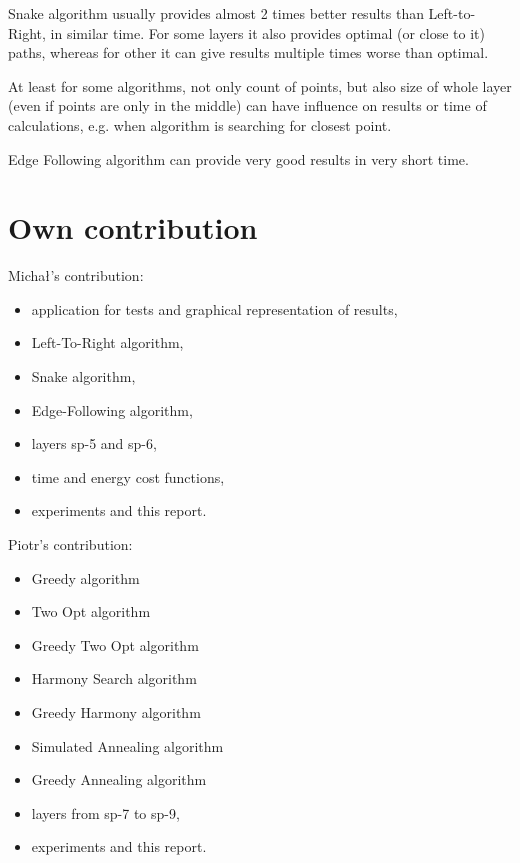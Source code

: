 \documentclass[titlepage]{article}
\begin{document}
Snake algorithm usually provides almost 2 times better results than Left-to-Right, in similar time. For some layers it also provides optimal (or close to it) paths, whereas for other it can give results multiple times worse than optimal.

At least for some algorithms, not only count of points, but also size of whole layer (even if points are only in the middle) can have influence on results or time of calculations, e.g. when algorithm is searching for closest point.

Edge Following algorithm can provide very good results in very short time.

\section{Own contribution}
Michał's contribution:
\begin{itemize}
\item application for tests and graphical representation of results,
\item Left-To-Right algorithm,
\item Snake algorithm,
\item Edge-Following algorithm,
\item layers sp-5 and sp-6,
\item time and energy cost functions,
\item experiments and this report.
\end{itemize}
Piotr's contribution:
\begin{itemize}
\item Greedy algorithm
\item Two Opt algorithm
\item Greedy Two Opt algorithm
\item Harmony Search algorithm
\item Greedy Harmony algorithm
\item Simulated Annealing algorithm
\item Greedy Annealing algorithm
\item layers from sp-7 to sp-9,
\item experiments and this report. 
\end{itemize}

\nocite{*}


\newpage
\tableofcontents

\newpage


\end{document}
